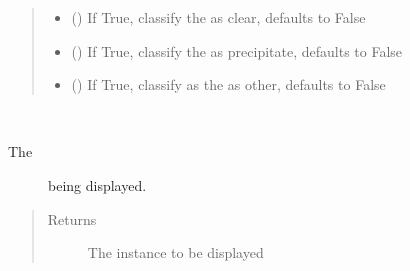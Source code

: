 \documentclass[letterpaper,10pt,english]{sphinxmanual}
\begin{document}
\begin{fulllineitems}
\begin{fulllineitems}
\begin{quote}
\begin{description}
\begin{itemize}
\item {} 
 (\sphinxstyleliteralemphasis{\sphinxupquote{, }}) \textendash{} If True, classify the  as clear,
defaults to False

\item {} 
 (\sphinxstyleliteralemphasis{\sphinxupquote{, }}) \textendash{} If True, classify the  as precipitate, 
defaults to False

\item {} 
 (\sphinxstyleliteralemphasis{\sphinxupquote{, }}) \textendash{} If True, classify as the  as other,
defaults to False

\end{itemize}

\end{description}\end{quote}

\end{fulllineitems}


\begin{fulllineitems}
\label{\detokenize{polo.windows:polo.windows.image_pop_dialog.ImagePopDialog.image}}~\begin{description}
\item[{The {\hyperref[\detokenize{polo.crystallography:polo.crystallography.image.Image}]{}}}] \leavevmode
being displayed.

\end{description}
\begin{quote}\begin{description}
\item[{Returns}] \leavevmode
The {\hyperref[\detokenize{polo.crystallography:polo.crystallography.image.Image}]{}} instance to be displayed


\end{description}
\end{quote}
\end{fulllineitems}
\end{fulllineitems}
\end{document}
